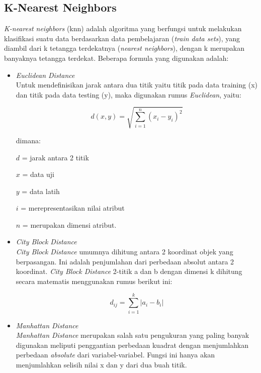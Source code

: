 \documentclass[conference]{IEEEtran}
\begin{document}
\subsection{K-Nearest Neighbors}

\emph{K-nearest neighbors} (knn) adalah algoritma yang berfungsi untuk melakukan klasifikasi suatu data berdasarkan data pembelajaran (\emph{train data sets}), yang diambil dari k tetangga terdekatnya (\emph{nearest neighbors}), dengan k merupakan banyaknya tetangga terdekat\cite{liao}. Beberapa formula yang digunakan adalah:

\begin{itemize}
\item \emph{Euclidean Distance}\\
Untuk mendefinisikan jarak antara dua titik yaitu titik pada data training (x) dan titik pada data testing (y), maka digunakan rumus \emph{Euclidean}\cite{nurhadi2017aplikasi}, yaitu:

\begin{equation*}
d(x,y)=\sqrt{\sum^{n}_{i=1} (x_i-y_i)^2}
\label{eq1}
\end{equation*}

dimana:

$d$ = jarak antara 2 titik

$x$ = data uji

$y$ = data latih

$i$ = merepresentasikan nilai atribut

$n$ = merupakan dimensi atribut.\vspace{10pt}

\item \emph{City Block Distance}\\
\emph{City Block Distance} umumnya dihitung antara 2 koordinat objek yang berpasangan. Ini adalah penjumlahan dari perbedaan absolut antara 2 koordinat. \emph{City Block Distance} 2-titik a dan b dengan dimensi k dihitung secara matematis menggunakan rumus berikut ini:

\begin{equation*}
d_{ij}=\sum^{k}_{i=1} | a_i-b_i |
\label{eq2}
\end{equation*}

\item \emph{Manhattan Distance}\\
\emph{Manhattan Distance} merupakan salah satu pengukuran yang paling banyak digunakan meliputi penggantian perbedaan kuadrat dengan menjumlahkan perbedaan \emph{absolute} dari variabel-variabel. Fungsi ini hanya akan menjumlahkan selisih nilai x dan y dari dua buah titik.
\vspace{10pt}


\end{itemize}
\end{document}
